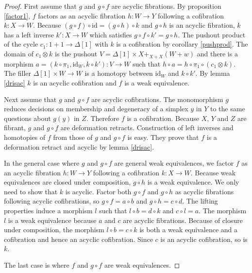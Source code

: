 \documentclass{amsart}
\theoremstyle{plain}
\theoremstyle{definition}
\newcommand\id{\mathrm{id}}
\begin{document}
\begin{proof}
First assume that $g$ and $g\circ f$ are acyclic fibrations. By proposition \ref{factor1}, $f$ factors as an acyclic fibration $h:W\to Y$ following a cofibration $k:X\to W$. Because $(g\circ f)\circ \id = (g\circ h)\circ k$ and $g\circ h$ is an acyclic fibration, $k$ has a left inverse $k':X\to W$ which satisfies $g\circ f\circ k' = g\circ h$. The pushout product of the cycle $c_1:1+1\to \Delta[1]$ with $k$ is a cofibration by corollary \ref{pushprod}. The domain of $c_1\otimes k$ is the pushout $V=\Delta[1]\times X+_{X+X}(W+w)$ and there is a morphism $a=(k\circ \pi_1,\id_W,k\circ k'):V\to W$ such that $h\circ a = h\circ \pi_1\circ (c_1\otimes k)$. The filler $\Delta[1]\times W\to W$ is a homotopy between $\id_W$ and $k\circ k'$. By lemma \ref{drisac} $k$ is an acyclic cofibration and $f$ is a weak equivalence.

Next assume that $g$ and $g\circ f$ are acyclic cofibrations. The monomorphism $g$ reduces decisions on membership and degeneracy of a simplex $y$ in $Y$ to the same questions about $g(y)$ in $Z$. Therefore $f$ is a cofibration. Because $X$, $Y$ and $Z$ are fibrant, $g$ and $g\circ f$ are deformation retracts. Construction of left inverses and homotopies of $f$ from those of $g$ and $g\circ f$ is easy. They prove that $f$ is a deformation retract and acyclic by lemma \ref{drisac}.


In the general case where $g$ and $g\circ f$ are general weak equivalences, we factor $f$ as an acyclic fibration $h:W\to Y$ following a cofibration $k:X\to W$. Because weak equivalences are closed under composition, $g\circ h$ is a weak equivalence. We only need to show that $k$ is acyclic. Factor both $g\circ f$ and $g\circ h$ as acyclic fibrations following acyclic cofibrations, so $g\circ f = a\circ b$ and $g\circ h = c\circ d$. The lifting properties induce a morphism $l$ such that $l\circ b = d\circ k$ and $c\circ l = a$. The morphism $l$ is a weak equivalence because $a$ and $c$ are acyclic fibrations. Because of closure under composition, the morphism $l\circ b = c\circ k$ is both a weak equivalence and a cofibration and hence an acyclic cofibration. Since $c$ is an acyclic cofibration, so is $k$.

The last case is where $f$ and $g\circ f$ are weak equivalences.


\end{proof}
\end{document}
